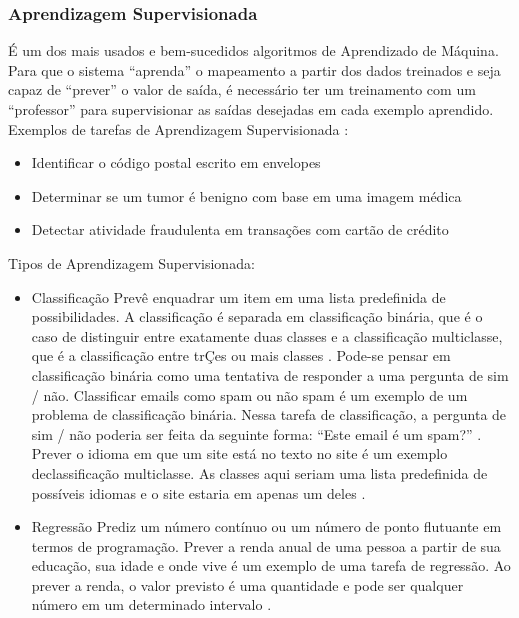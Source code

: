 \documentclass[
	12pt,				%
	openright,			%
	oneside,			%
	a4paper,			%
	english,			%
	spanish,			%
	brazil				%
	]{abntex2}
\begin{document}
	\subsubsection*{Aprendizagem Supervisionada}
		É um dos mais usados e bem-sucedidos algoritmos de Aprendizado de Máquina. Para que o sistema ``aprenda'' o mapeamento a partir dos dados treinados e seja capaz de ``prever''  o valor de saída, é necessário ter um treinamento com um ``professor'' para supervisionar as saídas desejadas em cada exemplo aprendido. Exemplos de tarefas de Aprendizagem Supervisionada \cite {guido_muller}: 
	\begin{itemize}
	 	\item Identificar o código postal escrito em envelopes
		\item Determinar se um tumor é benigno com base em uma imagem médica
		\item Detectar atividade fraudulenta em transações com cartão de crédito
	\end{itemize}

		Tipos de Aprendizagem Supervisionada:

	\begin{itemize}
	 	\item Classificação
			\subitem Prevê enquadrar um item em uma lista predefinida de possibilidades. A classificação é separada em classificação binária, que é o caso de distinguir entre exatamente duas classes e a classificação multiclasse, que é a classificação entre trÇes ou mais  classes \cite {guido_muller}. 
			\subitem Pode-se pensar em classificação binária como uma tentativa de responder a uma pergunta de sim / não. Classificar emails como spam ou não spam é um exemplo de um problema de classificação binária. Nessa tarefa de classificação, a pergunta de sim / não poderia ser feita da seguinte forma: ``Este email é um spam?'' \cite {guido_muller}.
			\subitem Prever o idioma em que um site está no texto no site é um exemplo declassificação multiclasse. As classes aqui seriam uma lista predefinida de possíveis idiomas e o site estaria em apenas um deles \cite {guido_muller}.
	\end{itemize}

	\begin{itemize}
	 	\item Regressão
			\subitem Prediz um número contínuo  ou um número de ponto flutuante em termos de programação. Prever a renda anual de uma pessoa a partir de sua educação, sua idade e onde vive é um exemplo de uma tarefa de regressão. Ao prever a renda, o valor previsto é uma quantidade e pode ser qualquer número em um determinado intervalo \cite {guido_muller}.
	\end{itemize}
\end{document}
